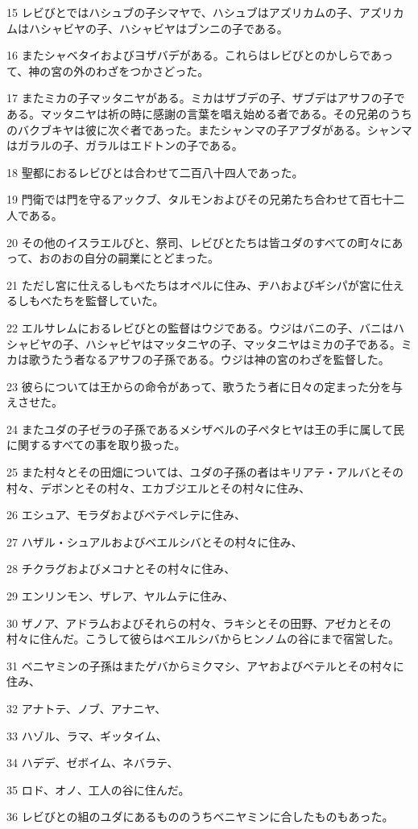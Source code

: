 \par 15 レビびとではハシュブの子シマヤで、ハシュブはアズリカムの子、アズリカムはハシャビヤの子、ハシャビヤはブンニの子である。
\par 16 またシャベタイおよびヨザバデがある。これらはレビびとのかしらであって、神の宮の外のわざをつかさどった。
\par 17 またミカの子マッタニヤがある。ミカはザブデの子、ザブデはアサフの子である。マッタニヤは祈の時に感謝の言葉を唱え始める者である。その兄弟のうちのバクブキヤは彼に次ぐ者であった。またシャンマの子アブダがある。シャンマはガラルの子、ガラルはエドトンの子である。
\par 18 聖都におるレビびとは合わせて二百八十四人であった。
\par 19 門衛では門を守るアックブ、タルモンおよびその兄弟たち合わせて百七十二人である。
\par 20 その他のイスラエルびと、祭司、レビびとたちは皆ユダのすべての町々にあって、おのおの自分の嗣業にとどまった。
\par 21 ただし宮に仕えるしもべたちはオペルに住み、ヂハおよびギシパが宮に仕えるしもべたちを監督していた。
\par 22 エルサレムにおるレビびとの監督はウジである。ウジはバニの子、バニはハシャビヤの子、ハシャビヤはマッタニヤの子、マッタニヤはミカの子である。ミカは歌うたう者なるアサフの子孫である。ウジは神の宮のわざを監督した。
\par 23 彼らについては王からの命令があって、歌うたう者に日々の定まった分を与えさせた。
\par 24 またユダの子ゼラの子孫であるメシザベルの子ペタヒヤは王の手に属して民に関するすべての事を取り扱った。
\par 25 また村々とその田畑については、ユダの子孫の者はキリアテ・アルバとその村々、デボンとその村々、エカブジエルとその村々に住み、
\par 26 エシュア、モラダおよびベテペレテに住み、
\par 27 ハザル・シュアルおよびベエルシバとその村々に住み、
\par 28 チクラグおよびメコナとその村々に住み、
\par 29 エンリンモン、ザレア、ヤルムテに住み、
\par 30 ザノア、アドラムおよびそれらの村々、ラキシとその田野、アゼカとその村々に住んだ。こうして彼らはベエルシバからヒンノムの谷にまで宿営した。
\par 31 ベニヤミンの子孫はまたゲバからミクマシ、アヤおよびベテルとその村々に住み、
\par 32 アナトテ、ノブ、アナニヤ、
\par 33 ハゾル、ラマ、ギッタイム、
\par 34 ハデデ、ゼボイム、ネバラテ、
\par 35 ロド、オノ、工人の谷に住んだ。
\par 36 レビびとの組のユダにあるもののうちベニヤミンに合したものもあった。

